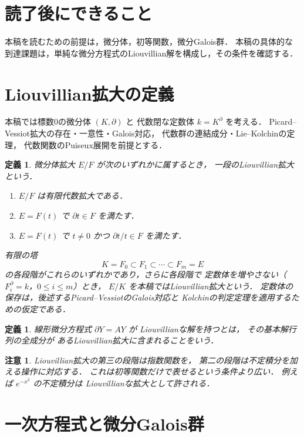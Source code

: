 \documentclass[a5paper,10pt,onecolumn]{jsarticle}
\theoremstyle{mathnotetheorem}
\newtheorem{definition}[theorem]{定義}
\newtheorem{remark}[theorem]{注意}
\begin{document}
\section*{読了後にできること}
本稿を読むための前提は，微分体，初等関数，微分Galois群．
本稿の具体的な到達課題は，単純な微分方程式のLiouvillian解を構成し，その条件を確認する．

\section{Liouvillian拡大の定義}

本稿では標数0の微分体 $(K,\partial)$ と
代数閉な定数体 $k=K^\partial$ を考える．
Picard--Vessiot拡大の存在・一意性・Galois対応，
代数群の連結成分・Lie--Kolchinの定理，
代数関数のPuiseux展開を前提とする．

\begin{definition}
微分体拡大 $E/F$ が次のいずれかに属するとき，
一段のLiouvillian拡大という．
\begin{enumerate}
\item $E/F$ は有限代数拡大である．
\item $E=F(t)$ で $\partial t\in F$ を満たす．
\item $E=F(t)$ で $t\ne0$ かつ
 $\partial t/t\in F$ を満たす．
\end{enumerate}
有限の塔
\[
 K=F_0\subset F_1\subset\cdots\subset F_m=E
\]
の各段階がこれらのいずれかであり，さらに各段階で
定数体を増やさない（$F_i^\partial=k$，$0\le i\le m$）とき，
$E/K$ を本稿ではLiouvillian拡大という．
定数体の保存は，後述するPicard--VessiotのGalois対応と
Kolchinの判定定理を適用するための仮定である．
\end{definition}

\begin{definition}
線形微分方程式 $\partial Y=AY$ が
\emph{Liouvillianな解を持つ}とは，
その基本解行列の全成分が
あるLiouvillian拡大に含まれることをいう．
\end{definition}

\begin{remark}
Liouvillian拡大の第三の段階は指数関数を，
第二の段階は不定積分を加える操作に対応する．
これは初等関数だけで表せるという条件より広い．
例えば $e^{-x^2}$ の不定積分は
Liouvillianな拡大として許される．
\end{remark}

\section{一次方程式と微分Galois群}
\end{document}

